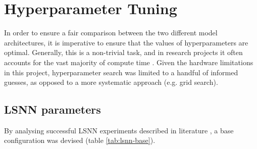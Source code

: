 \documentclass[../../report.tex]{subfiles}
\begin{document}
\section{Hyperparameter Tuning}

In order to ensure a fair comparison between the two different model
architectures, it is imperative to ensure that the values of hyperparameters are
optimal. Generally, this is a non-trivial task, and in research projects it
often accounts for the vast majority of compute time \cite{Strubell2019}. Given
the hardware limitations in this project, hyperparameter search was limited to a
handful of informed guesses, as opposed to a more systematic approach (e.g. grid
search).

\subsection{LSNN parameters}

By analysing successful LSNN experiments described in literature
\cite{Bellec2018LSNN, Bellec2020}, a base configuration was devised (table
\ref{tab:lsnn-base}).
\end{document}
